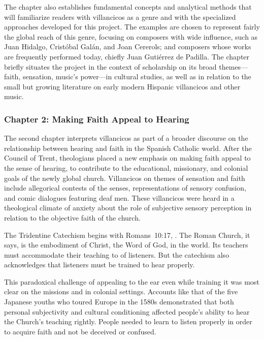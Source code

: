 \documentclass{vcbook-proposal}
\begin{document}
The chapter also establishes fundamental concepts and analytical methods that will familiarize readers with villancicos as a genre and with the specialized approaches developed for this project.
The examples are chosen to represent fairly the global reach of this genre, focusing on composers with wide influence, such as Juan Hidalgo, Cristóbal Galán, and Joan Cererols; and composers whose works are frequently performed today, chiefly Juan Gutiérrez de Padilla.
The chapter briefly situates the project in the context of scholarship on its broad themes---faith, sensation, music's power---in cultural studies, as well as in relation to the small but growing literature on early modern Hispanic villancicos and other music.

\subsubsection{Chapter 2: Making Faith Appeal to Hearing}

The second chapter interprets villancicos as part of a broader discourse on the relationship between hearing and faith in the Spanish Catholic world.
After the Council of Trent, theologians placed a new emphasis on making faith appeal to the sense of hearing, to contribute to the educational, missionary, and colonial goals of the newly global church.
Villancicos on themes of sensation and faith include allegorical contests of the senses, representations of sensory confusion, and comic dialogues featuring deaf men.
These villancicos were heard in a theological climate of anxiety about the role of subjective sensory perception in relation to the objective faith of the church.

The Tridentine Catechism begins with Romans~10:17, .
The Roman Church, it says, is the embodiment of Christ, the Word of God, in the world.
Its teachers must accommodate their teaching to  of listeners.
But the catechism also acknowledges that listeners must be trained to hear properly.

This paradoxical challenge of appealing to the ear even while training it was most clear on the missions and in colonial settings.
Accounts like that of the five Japanese youths who toured Europe in the 1580s demonstrated that both personal subjectivity and cultural conditioning affected people's ability to hear the Church's teaching rightly.
People needed to learn to listen properly in order to acquire faith and not be deceived or confused.
\end{document}

